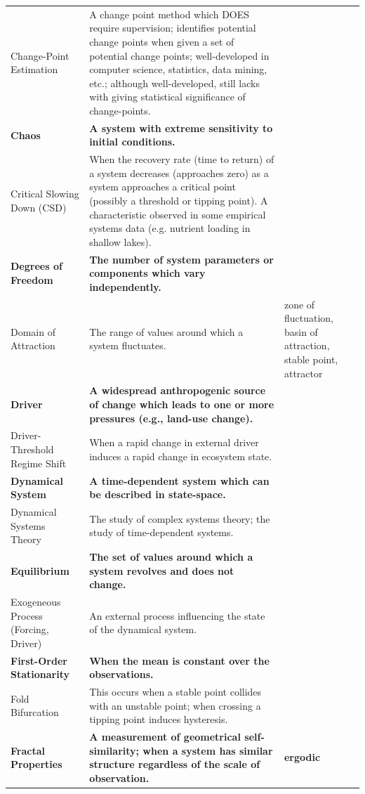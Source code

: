 \documentclass[12pt,twoside,openany]{reedthesis}
\begin{document}
\begin{landscape}
\begin{longtable}{>{\raggedright\arraybackslash}p{12em}>{\raggedright\arraybackslash}p{35em}>{\raggedright\arraybackslash}p{8em}}
Change-Point Estimation & A change point method which DOES require supervision; identifies potential change points when given a set of potential change points; well-developed in computer science, statistics, data mining, etc.; although well-developed, still lacks with giving statistical significance of change-points. & \\
\textbf{Chaos} & \textbf{A system with extreme sensitivity to initial conditions.} & \textbf{}\\
\addlinespace
Critical Slowing Down (CSD) & When the recovery rate (time to return) of a system decreases (approaches zero) as a system approaches a critical point (possibly a threshold or tipping point). A characteristic observed in some empirical systems data (e.g. nutrient loading in shallow lakes). & \\
\textbf{Degrees of Freedom} & \textbf{The number of system parameters or components which vary independently.} & \textbf{}\\
Domain of Attraction & The range of values around which a system fluctuates. & zone of fluctuation, basin of attraction, stable point, attractor\\
\textbf{Driver} & \textbf{A widespread anthropogenic source of change which leads to one or more pressures (e.g., land-use change).} & \textbf{}\\
Driver-Threshold Regime Shift & When a rapid change in external driver induces a rapid change in ecosystem state. & \\
\addlinespace
\textbf{Dynamical System} & \textbf{A time-dependent system which can be described in state-space.} & \textbf{}\\
Dynamical Systems Theory & The study of complex systems theory; the study of time-dependent systems. & \\
\textbf{Equilibrium} & \textbf{The set of values around which a system revolves and does not change.} & \textbf{}\\
Exogeneous Process (Forcing, Driver) & An external process influencing the state of the dynamical system. & \\
\textbf{First-Order Stationarity} & \textbf{When the mean is constant over the observations.} & \textbf{}\\
\addlinespace
Fold Bifurcation & This occurs when a stable point collides with an unstable point; when crossing a tipping point induces hysteresis. & \\
\textbf{Fractal Properties} & \textbf{A measurement of geometrical self-similarity; when a system has similar structure regardless of the scale of observation.} & \textbf{ergodic}\\

\end{longtable}
\end{landscape}
\end{document}
